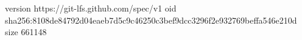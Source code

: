 version https://git-lfs.github.com/spec/v1
oid sha256:8108de84792d04eaeb7d5c9c46250c3bef9dcc3296f2e932769beffa546e210d
size 661148
